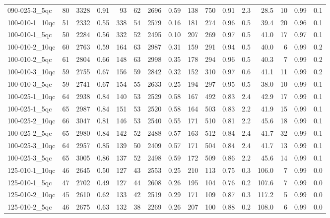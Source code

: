 \documentclass[twoside]{article}
\begin{document}
\begin{longtable}{l|rrrr|rrrr|rrr|rrrr}
		090-025-3\_5qc & 80 & 3328 & 0.91 & 93 & 62 & 2696 & 0.59 & 138 & 750 & 0.91 & 2.3 & 28.5 & 10 & 0.99 & 0.1 \\
		100-010-1\_10qc & 51 & 2332 & 0.55 & 338 & 54 & 2579 & 0.16 & 181 & 274 & 0.96 & 0.5 & 39.4 & 20 & 0.96 & 0.1 \\
		100-010-1\_5qc & 50 & 2284 & 0.56 & 332 & 52 & 2495 & 0.10 & 207 & 269 & 0.97 & 0.5 & 41.0 & 17 & 0.97 & 0.1 \\
		100-010-2\_10qc & 60 & 2763 & 0.59 & 164 & 63 & 2987 & 0.31 & 159 & 291 & 0.94 & 0.5 & 40.0 & 6 & 0.99 & 0.2 \\
		100-010-2\_5qc & 61 & 2804 & 0.66 & 148 & 63 & 2998 & 0.35 & 178 & 294 & 0.96 & 0.5 & 40.3 & 7 & 0.99 & 0.2 \\
		100-010-3\_10qc & 59 & 2755 & 0.67 & 156 & 59 & 2842 & 0.32 & 152 & 310 & 0.97 & 0.6 & 41.1 & 11 & 0.99 & 0.2 \\
		100-010-3\_5qc & 59 & 2741 & 0.67 & 154 & 55 & 2633 & 0.25 & 194 & 297 & 0.95 & 0.5 & 38.0 & 10 & 0.99 & 0.1 \\
		100-025-1\_10qc & 64 & 2938 & 0.84 & 140 & 53 & 2529 & 0.58 & 167 & 492 & 0.83 & 2.4 & 42.9 & 17 & 0.99 & 0.1 \\
		100-025-1\_5qc & 65 & 2987 & 0.84 & 151 & 53 & 2520 & 0.58 & 164 & 503 & 0.83 & 2.2 & 41.9 & 15 & 0.99 & 0.1 \\
		100-025-2\_10qc & 66 & 3047 & 0.81 & 146 & 53 & 2540 & 0.55 & 171 & 510 & 0.81 & 2.2 & 45.6 & 18 & 0.99 & 0.1 \\
		100-025-2\_5qc & 65 & 2980 & 0.84 & 142 & 52 & 2488 & 0.57 & 163 & 512 & 0.84 & 2.4 & 41.7 & 32 & 0.99 & 0.1 \\
		100-025-3\_10qc & 64 & 2957 & 0.85 & 139 & 50 & 2409 & 0.57 & 171 & 504 & 0.84 & 2.4 & 41.7 & 13 & 0.99 & 0.1 \\
		100-025-3\_5qc & 65 & 3005 & 0.86 & 137 & 52 & 2498 & 0.59 & 172 & 509 & 0.86 & 2.2 & 45.6 & 14 & 0.99 & 0.1 \\
		125-010-1\_10qc & 46 & 2645 & 0.50 & 127 & 43 & 2553 & 0.25 & 210 & 113 & 0.75 & 0.3 & 106.0 & 7 & 0.99 & 0.0 \\
		125-010-1\_5qc & 47 & 2702 & 0.49 & 127 & 44 & 2608 & 0.26 & 195 & 104 & 0.76 & 0.2 & 107.6 & 7 & 0.99 & 0.0 \\
		125-010-2\_10qc & 45 & 2610 & 0.62 & 133 & 42 & 2519 & 0.29 & 171 & 109 & 0.87 & 0.3 & 117.2 & 5 & 0.99 & 0.0 \\
		125-010-2\_5qc & 46 & 2675 & 0.63 & 132 & 38 & 2269 & 0.26 & 207 & 100 & 0.88 & 0.2 & 108.0 & 6 & 0.99 & 0.0 \\

\end{longtable}
\end{document}
